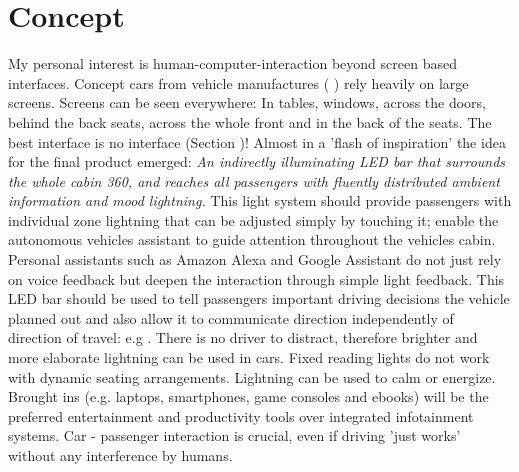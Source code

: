 \section{Concept}
\label{sec:concept}
My personal interest is human-computer-interaction beyond screen based interfaces. Concept cars from vehicle manufactures ( ) rely heavily on large screens. Screens can be seen everywhere: In tables, windows, across the doors, behind the back seats, across the whole front and in the back of the seats. The best interface is no interface (Section )! 
Almost in a 'flash of inspiration' the idea for the final product emerged: \emph{An indirectly illuminating LED bar that surrounds the whole cabin 360, and reaches all passengers with fluently distributed ambient information and mood lightning.} This light system should provide passengers with individual zone lightning that can be adjusted simply by touching it; enable the autonomous vehicles assistant to guide attention throughout the vehicles cabin. Personal assistants such as Amazon Alexa and Google Assistant do not just rely on voice feedback but deepen the interaction through simple light feedback. This LED bar should be used to tell passengers important driving decisions the vehicle planned out and also allow it to communicate direction independently of direction of travel: e.g .
There is no driver to distract, therefore brighter and more elaborate lightning can be used in cars. Fixed reading lights do not work with dynamic seating arrangements. Lightning can be used to calm or energize. Brought ins (e.g. laptops, smartphones, game consoles and ebooks) will be the preferred entertainment and productivity tools over integrated infotainment systems. Car - passenger interaction is crucial, even if driving 'just works' without any interference by humans. 


